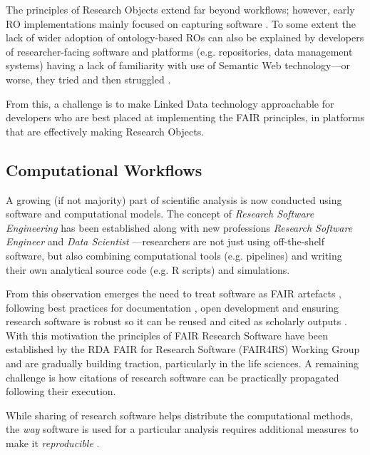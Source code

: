 The principles of Research Objects extend far beyond workflows; however, early RO implementations mainly focused on capturing software \cite{Goble 2018}. To some extent the lack of wider adoption of ontology-based ROs can also be explained by developers of researcher-facing software and platforms (e.g. repositories, data management systems) having a lack of familiarity with use of Semantic Web technology---or worse, they tried and then struggled \cite{Carriero 2010,Tudorache 2020}.

From this, a challenge is to make Linked Data technology approachable for developers who are best placed at implementing the FAIR principles, in platforms that are effectively making Research Objects.




\subsection{Computational Workflows}

A growing (if not majority) part of scientific analysis is now conducted using software and computational models. The concept of \emph{Research Software Engineering} \cite{Cohen 2020} has been established along with new professions \emph{Research Software Engineer} \cite{Baxter 2012} and \emph{Data Scientist} \cite{van der Aalst 2014}---researchers are not just using off-the-shelf software, but also combining computational tools (e.g. pipelines) and writing their own analytical source code (e.g. R scripts) and simulations.

From this observation emerges the need to treat software as FAIR artefacts \cite{Lamprecht 2019}, following best practices for documentation \cite{Lee 2018}, open development \cite{Prlić 2012} and ensuring research software is robust \cite{Taschuk 2017} so it can be reused and cited as scholarly outputs \cite{Smith 2016}. 
With this motivation the principles of FAIR Research Software \cite{Katz 2021b} have been established by the RDA FAIR for Research Software (FAIR4RS) Working Group \cite{Barker 2022} and are gradually building traction, particularly in the life sciences. A remaining challenge is how citations of research software can be practically propagated following their execution. 

While sharing of research software helps distribute the computational methods, the \emph{way} software is used for a particular analysis requires additional measures to make it \emph{reproducible} \cite{Stodden 2016,Sandve 2013}.

